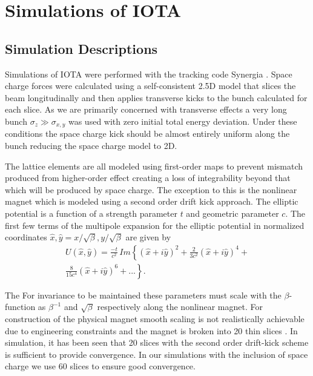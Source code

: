 \documentclass[aps,prstab,twocolumn, groupedaddress]{revtex4-1}
\begin{document}
\section{Simulations of IOTA}
\subsection{Simulation Descriptions}

Simulations of IOTA were performed with the tracking code Synergia \cite{synergia}. Space 
charge forces were calculated using a self-consistent 2.5D model that slices the beam 
longitudinally and then applies transverse kicks to the bunch calculated for each slice. As 
we are primarily concerned with transverse effects a very long bunch $\sigma_z \gg 
\sigma_{x,y}$ was used with zero initial total energy deviation. Under these conditions the 
space charge kick should be almost entirely uniform along the bunch reducing the space 
charge model to 2D. 

The lattice elements are all modeled using first-order maps to prevent mismatch produced 
from higher-order effect creating a loss of integrability beyond that which will be 
produced by space charge. The exception to this is the nonlinear magnet which is 
modeled using a second order drift kick approach. The elliptic potential is a function of a 
strength parameter $t$ and geometric parameter $c$. The first few terms of the multipole 
expansion for the elliptic potential in normalized coordinates
$\hat{x}, \hat{y} = x / \sqrt{\beta}, y / \sqrt{\beta}$ are given by %
\begin{multline} \label{eq:expansion}
U(\hat{x}, \hat{y}) = \frac{-t}{c^2} \, Im\left\lbrace (\hat{x}+i\hat{y})^2 +
\frac{2}{3c^2}(\hat{x} + i\hat{y})^4 + \right. \\
\left. \frac{8}{15c^4}(\hat{x}+i\hat{y})^6 + ... \right\rbrace.
\end{multline}

The  For invariance to be maintained 
these parameters must scale with the $\beta$-function as $\beta^{-1}$ and $\sqrt{\beta}$ 
respectively along the nonlinear magnet. For construction of the physical magnet smooth 
scaling is not realistically achievable due to engineering constraints and the magnet is 
broken into 20 thin slices \cite{o2013measurement}. In simulation, it has been seen that 
20 slices with the second order drift-kick scheme is sufficient to provide convergence. In 
our simulations with the inclusion of space charge we use 60 slices to ensure good 
convergence.
\end{document}
